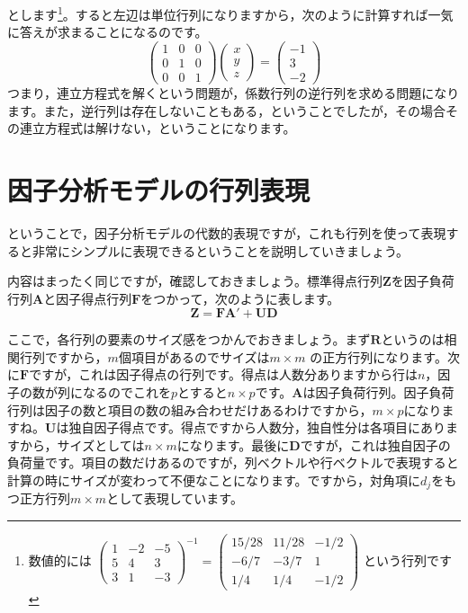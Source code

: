とします\footnote{数値的には
$\begin{pmatrix} 1 & -2 & -5 \\
                5 & 4  & 3  \\
                3 & 1  & -3\end{pmatrix}^{-1}
	=
	\begin{pmatrix} 15/28 & 11/28 & -1/2 \\
                -6/7  & -3/7  & 1    \\
                1/4   & 1/4   & -1/2\end{pmatrix}
$
という行列です}。すると左辺は単位行列になりますから，次のように計算すれば一気に答えが求まることになるのです。
\[
	\begin{pmatrix} 1 & 0 & 0 \\
                0 & 1 & 0 \\
                0 & 0 & 1\end{pmatrix}
	\begin{pmatrix} x \\ y \\ z \end{pmatrix}
	=
	\begin{pmatrix} -1 \\ 3 \\ -2 \end{pmatrix}
\]
つまり，連立方程式を解くという問題が，係数行列の逆行列を求める問題になります。また，逆行列は存在しないこともある，ということでしたが，その場合その連立方程式は解けない，ということになります。




\section{ 因子分析モデルの行列表現}
ということで，因子分析モデルの代数的表現ですが，これも行列を使って表現すると非常にシンプルに表現できるということを説明していきましょう。

内容はまったく同じですが，確認しておきましょう。標準得点行列$\bm{Z}$を因子負荷行列$\bm{A}$と因子得点行列$\bm{F}$をつかって，次のように表します。
\begin{equation}
	\bm{Z} = \bm{F} \bm{A} ' + \bm{U} \bm{D}
\end{equation}

ここで，各行列の要素のサイズ感をつかんでおきましょう。まず$\bm{R}$というのは相関行列ですから，$m$個項目があるのでサイズは$m \times m$ の正方行列になります。次に$\bm{F}$ですが，これは因子得点の行列です。得点は人数分ありますから行は$n$，因子の数が列になるのでこれを$p$とすると$n\times p$です。$\bm{A}$は因子負荷行列。因子負荷行列は因子の数と項目の数の組み合わせだけあるわけですから，$m \times p$になりますね。$\bm{U}$は独自因子得点です。得点ですから人数分，独自性分は各項目にありますから，サイズとしては$n \times m$になります。最後に$\bm{D}$ですが，これは独自因子の負荷量です。項目の数だけあるのですが，列ベクトルや行ベクトルで表現すると計算の時にサイズが変わって不便なことになります。ですから，対角項に$d_j$をもつ正方行列$m \times m$として表現しています。

